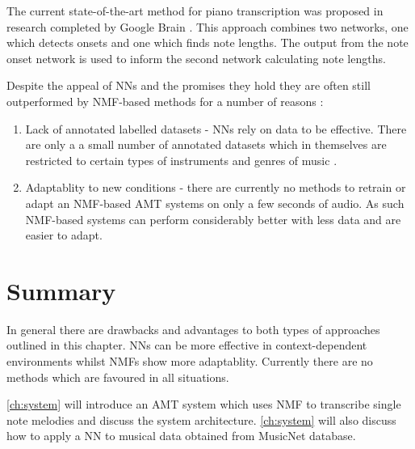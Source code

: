 The current state-of-the-art method for piano transcription was proposed in
research completed by Google Brain \cite{google2018:Elsen}. This approach
combines two networks, one which detects onsets and one which finds note
lengths. The output from the note onset network is used to inform the second
network calculating note lengths.

Despite the appeal of NNs and the promises they hold they are often still
outperformed by \ac{NMF}-based methods for a number of reasons :
\begin{enumerate}
  \item Lack of annotated labelled datasets - \ac{NN}s rely on data to be
        effective. There are only a a small number of annotated datasets which
        in themselves are restricted to certain types of instruments and genres
        of music \cite{ground-truths:Su}.
  \item Adaptablity to new conditions - there are currently no methods to
        retrain or adapt an \ac{NMF}-based \ac{AMT} systems on only a few seconds of audio.
        As such \ac{NMF}-based systems can perform considerably better with less data
        and are easier to adapt.
\end{enumerate}

\section{Summary}

In general there are drawbacks and advantages to both types of approaches
outlined in this chapter. \ac{NN}s can be more effective in context-dependent
environments whilst \ac{NMF}s show more adaptablity. Currently there are no methods
which are favoured in all situations.

\autoref{ch:system} will introduce an \ac{AMT} system which uses \ac{NMF} to transcribe
single note melodies and discuss the system architecture. \autoref{ch:system}
will also discuss how to apply a \ac{NN} to musical data obtained from
\citeyear{thickstun2018invariances} MusicNet database.